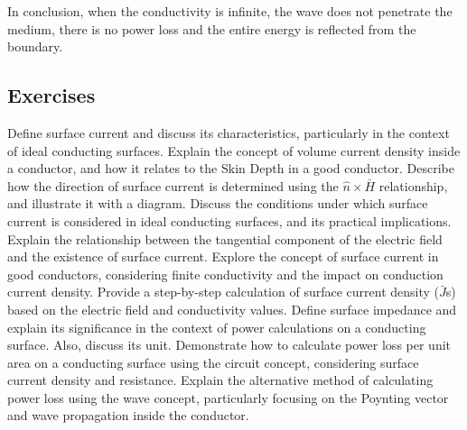 In conclusion, when the conductivity is infinite, the wave does not penetrate the medium, there is no power loss and the entire energy is reflected from the boundary.


\begin{mdframed}[backgroundcolor=lightblue, linewidth=1pt,  hidealllines=true]
\section{Exercises}
\begin{ExerciseList}
\Exercise[label={ex281}] Define surface current and discuss its characteristics, particularly in the context of ideal conducting surfaces.
\Exercise[label={ex282}] Explain the concept of volume current density inside a conductor, and how it relates to the Skin Depth in a good conductor.
\Exercise[label={ex283}] Describe how the direction of surface current is determined using the $\hat{n}\times \bar{H}$ relationship, and illustrate it with a diagram.
\Exercise[label={ex284}] Discuss the conditions under which surface current is considered in ideal conducting surfaces, and its practical implications.
\Exercise[label={ex285}] Explain the relationship between the tangential component of the electric field and the existence of surface current.
\Exercise[label={ex286}] Explore the concept of surface current in good conductors, considering finite conductivity and the impact on conduction current density.
\Exercise[label={ex287}] Provide a step-by-step calculation of surface current density ($\bar{J}$s) based on the electric field and conductivity values.
\Exercise[label={ex288}] Define surface impedance and explain its significance in the context of power calculations on a conducting surface. Also, discuss its unit.
\Exercise[label={ex289}] Demonstrate how to calculate power loss per unit area on a conducting surface using the circuit concept, considering surface current density and resistance.
\Exercise[label={ex2810}] Explain the alternative method of calculating power loss using the wave concept, particularly focusing on the Poynting vector and wave propagation inside the conductor.
\end{ExerciseList}
\end{mdframed}
